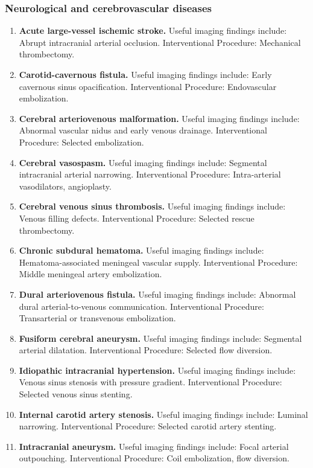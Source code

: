 \subsubsection{Neurological and cerebrovascular diseases}
\begin{enumerate}[leftmargin=*,itemsep=0.45em,topsep=0.4em]
\item \textbf{Acute large-vessel ischemic stroke.} Useful imaging findings include: Abrupt intracranial arterial occlusion. Interventional Procedure: Mechanical thrombectomy.
\item \textbf{Carotid-cavernous fistula.} Useful imaging findings include: Early cavernous sinus opacification. Interventional Procedure: Endovascular embolization.
\item \textbf{Cerebral arteriovenous malformation.} Useful imaging findings include: Abnormal vascular nidus and early venous drainage. Interventional Procedure: Selected embolization.
\item \textbf{Cerebral vasospasm.} Useful imaging findings include: Segmental intracranial arterial narrowing. Interventional Procedure: Intra-arterial vasodilators, angioplasty.
\item \textbf{Cerebral venous sinus thrombosis.} Useful imaging findings include: Venous filling defects. Interventional Procedure: Selected rescue thrombectomy.
\item \textbf{Chronic subdural hematoma.} Useful imaging findings include: Hematoma-associated meningeal vascular supply. Interventional Procedure: Middle meningeal artery embolization.
\item \textbf{Dural arteriovenous fistula.} Useful imaging findings include: Abnormal dural arterial-to-venous communication. Interventional Procedure: Transarterial or transvenous embolization.
\item \textbf{Fusiform cerebral aneurysm.} Useful imaging findings include: Segmental arterial dilatation. Interventional Procedure: Selected flow diversion.
\item \textbf{Idiopathic intracranial hypertension.} Useful imaging findings include: Venous sinus stenosis with pressure gradient. Interventional Procedure: Selected venous sinus stenting.
\item \textbf{Internal carotid artery stenosis.} Useful imaging findings include: Luminal narrowing. Interventional Procedure: Selected carotid artery stenting.
\item \textbf{Intracranial aneurysm.} Useful imaging findings include: Focal arterial outpouching. Interventional Procedure: Coil embolization, flow diversion.

\end{enumerate}
